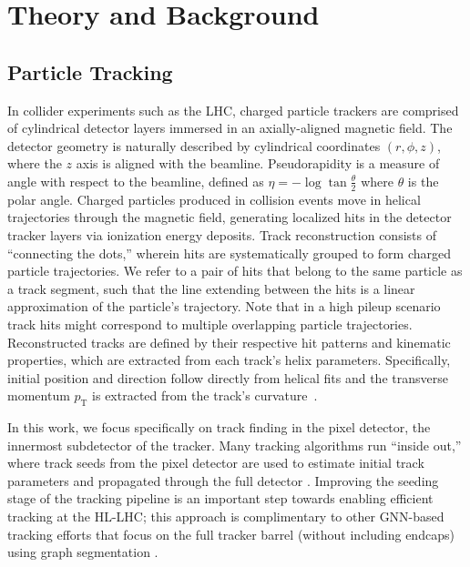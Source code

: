 \documentclass[twocolumn]{svjour3}
\newcommand{\pt}{\ensuremath{p_{\mathrm{T}}}\xspace}
\begin{document}
\section{Theory and Background }
\label{sec:theory}

\subsection{Particle Tracking} 
\label{sec-2.1}

In collider experiments such as the LHC, charged particle trackers are comprised of cylindrical detector layers immersed in an axially-aligned magnetic field. 
The detector geometry is naturally described by cylindrical coordinates $(r,\phi,z)$, where the $z$ axis is aligned with the beamline. 
Pseudorapidity is a measure of angle with respect to the beamline, defined as $\eta=-\log\tan\frac{\theta}{2}$ where $\theta$ is the polar angle.
Charged particles produced in collision events move in helical trajectories through the magnetic field, generating localized hits in the detector tracker layers via ionization energy deposits. 
Track reconstruction consists of ``connecting the dots,'' wherein hits are systematically grouped to form charged particle trajectories. 
We refer to a pair of hits that belong to the same particle as a track segment, such that the line extending between the hits is a linear approximation of the particle's trajectory. 
Note that in a high pileup scenario track hits might correspond to multiple overlapping particle trajectories. 
Reconstructed tracks are defined by their respective hit patterns and kinematic properties, which are extracted from each track's helix parameters. 
Specifically, initial position and direction follow directly from helical fits and the transverse momentum $\pt$ is extracted from the track's curvature~\cite{tracking}. 

In this work, we focus specifically on track finding in the pixel detector, the innermost subdetector of the tracker. 
Many tracking algorithms run ``inside out,'' where track seeds from the pixel detector are used to estimate initial track parameters and propagated through the full detector \cite{cms_tracking}.  
Improving the seeding stage of the tracking pipeline is an important step towards enabling efficient tracking at the HL-LHC; this approach is complimentary to other GNN-based tracking efforts that focus on the full tracker barrel (without including endcaps) using graph segmentation \cite{exatrkx}. 
\end{document}
